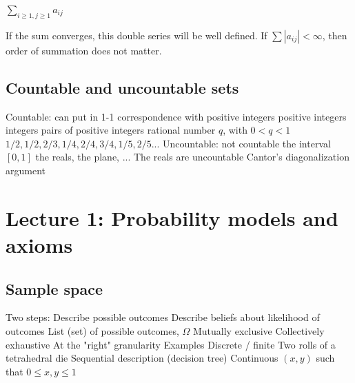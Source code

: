 {{{{$\sum\limits_{i\geq1, j\geq1} a_{ij}$
\begin{outline}
\1 If the sum converges, this double series will be well defined.
\1 If $\sum |a_{ij}| < \infty$, then order of summation does not matter.
\end{outline}


\subsection{Countable and uncountable sets}

\begin{outline}
\1 Countable: can put in 1-1 correspondence with positive integers
  \2 positive integers
  \2 integers
  \2 pairs of positive integers
  \2 rational number $q$, with $0 < q < 1$
    \3 $1/2, 1/2, 2/3, 1/4, 2/4, 3/4, 1/5, 2/5 ...$
\1 Uncountable: not countable
  \2 the interval $[0,1]$
  \2 the reals, the plane, ...
\1 The reals are uncountable
  \2 Cantor's diagonalization argument
\end{outline}





\section{Lecture 1: Probability models and axioms}

\subsection{Sample space}
\begin{outline}
\1 Two steps:
  \2 Describe possible outcomes
  \2 Describe beliefs about likelihood of outcomes
\1 List (set) of possible outcomes, $\Omega$
  \2 Mutually exclusive
  \2 Collectively exhaustive
  \2 At the "right" granularity
\1 Examples
  \2 Discrete / finite
    \3 Two rolls of a tetrahedral die
    \3 Sequential description (decision tree)
  \2 Continuous
    \3 $(x,y)$ such that $0 \leq x, y \leq 1$
\end{outline}


}}}}
